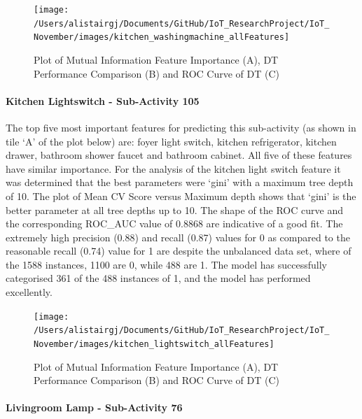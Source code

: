 \documentclass[11pt,]{article}
\let\oldparagraph\paragraph
\renewcommand{\paragraph}[1]{\oldparagraph{#1}\mbox{}}
\begin{document}
\begin{figure}[H]

{\centering \texttt{[image: /Users/alistairgj/Documents/GitHub/IoT\_ResearchProject/IoT\_November/images/kitchen\_washingmachine\_allFeatures]} 

}

\caption{Plot of Mutual Information Feature Importance (A), DT Performance Comparison (B) and ROC Curve of DT (C)}\label{fig:unnamed-chunk-18}
\end{figure}

\hypertarget{kitchen-lightswitch---sub-activity-105-1}{%
\paragraph{Kitchen Lightswitch - Sub-Activity
105}\label{kitchen-lightswitch---sub-activity-105-1}}

The top five most important features for predicting this sub-activity
(as shown in tile `A' of the plot below) are: foyer light switch,
kitchen refrigerator, kitchen drawer, bathroom shower faucet and
bathroom cabinet. All five of these features have similar importance.
For the analysis of the kitchen light switch feature it was determined
that the best parameters were `gini' with a maximum tree depth of 10.
The plot of Mean CV Score versus Maximum depth shows that `gini' is the
better parameter at all tree depths up to 10. The shape of the ROC curve
and the corresponding ROC\_AUC value of 0.8868 are indicative of a good
fit. The extremely high precision (0.88) and recall (0.87) values for 0
as compared to the reasonable recall (0.74) value for 1 are despite the
unbalanced data set, where of the 1588 instances, 1100 are 0, while 488
are 1. The model has successfully categorised 361 of the 488 instances
of 1, and the model has performed excellently.

\begin{figure}[H]

{\centering \texttt{[image: /Users/alistairgj/Documents/GitHub/IoT\_ResearchProject/IoT\_November/images/kitchen\_lightswitch\_allFeatures]} 

}

\caption{Plot of Mutual Information Feature Importance (A), DT Performance Comparison (B) and ROC Curve of DT (C)}\label{fig:unnamed-chunk-19}
\end{figure}

\hypertarget{livingroom-lamp---sub-activity-76-1}{%
\paragraph{Livingroom Lamp - Sub-Activity
76}\label{livingroom-lamp---sub-activity-76-1}}
\end{document}
